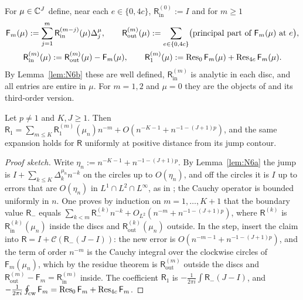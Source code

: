 For $\mu\in\mathbb{C}^J$ define, near each $e\in\{0,4c\}$, $\mathsf R_{\mathrm{in}}^{(0)}:=I$ and for $m\ge1$
\begin{equation}\label{eq:recursion}
\begin{gathered}
  \mathsf F_m(\mu):=\sum_{j=1}^m\mathsf R_{\mathrm{in}}^{(m-j)}(\mu)\Delta_j^\mu,\qquad
  \mathsf R_{\mathrm{out}}^{(m)}(\mu):=\sum_{e\in\{0,4c\}}\bigl(\text{principal part of }\mathsf F_m(\mu)\text{ at }e\bigr),\\
  \mathsf R_{\mathrm{in}}^{(m)}(\mu):=\mathsf R_{\mathrm{out}}^{(m)}(\mu)-\mathsf F_m(\mu),\qquad
  \mathsf R_1^{(m)}(\mu):=\operatorname{Res}_0\mathsf F_m(\mu)+\operatorname{Res}_{4c}\mathsf F_m(\mu).
\end{gathered}
\end{equation}
By Lemma~\ref{lem:N6b} these are well defined, $\mathsf R_{\mathrm{in}}^{(m)}$ is analytic in each disc, and all entries are
entire in $\mu$. For $m=1,2$ and $\mu=0$ they are the objects of \cite[Proposition~9.5]{PaperII} and its third-order
version.

\begin{proposition}\label{prop:N6c}
Let $p\ne1$ and $K,J\ge1$. Then $\mathsf R_1=\sum_{m\le K}\mathsf R_1^{(m)}(\mu_n)n^{-m}+O(n^{-K-1}+n^{-1-(J+1)p})$, and the
same expansion holds for $\mathsf R$ uniformly at positive distance from its jump contour.
\end{proposition}

\begin{proof}[Proof sketch]
Write $\eta_n:=n^{-K-1}+n^{-1-(J+1)p}$. By Lemma~\ref{lem:N6a} the jump is $I+\sum_{k\le K}\Delta_k^{\mu_n}n^{-k}$ on the circles
up to $O(\eta_n)$, and off the circles it is $I$ up to errors that are $O(\eta_n)$ in $L^1\cap L^2\cap L^\infty$, as in
\cite[Propositions~9.5 and~10.8]{PaperII}; the Cauchy operator is bounded uniformly in $n$. One proves by induction on
$m=1,\dots,K+1$ that the boundary value $\mathsf R_-$ equals $\sum_{k<m}\mathsf R_-^{(k)}n^{-k}+O_{L^2}(n^{-m}+n^{-1-(J+1)p})$, where
$\mathsf R^{(k)}$ is $\mathsf R^{(k)}_{\mathrm{in}}(\mu_n)$ inside the discs and $\mathsf R^{(k)}_{\mathrm{out}}(\mu_n)$ outside. In the
step, insert the claim into $\mathsf R=I+\mathcal C(\mathsf R_-(J-I))$: the new error is
$O(n^{-m-1}+n^{-1-(J+1)p})$, and the term of order $n^{-m}$ is the Cauchy integral over the clockwise circles of
$\mathsf F_m(\mu_n)$, which by the residue theorem is $\mathsf R_{\mathrm{out}}^{(m)}$ outside the discs and
$\mathsf R_{\mathrm{out}}^{(m)}-\mathsf F_m=\mathsf R_{\mathrm{in}}^{(m)}$ inside. The coefficient $\mathsf R_1$ is
$-\frac1{2\pi i}\int\mathsf R_-(J-I)$, and $-\frac1{2\pi i}\oint_{\mathrm{cw}}\mathsf F_m=\operatorname{Res}_0\mathsf F_m+\operatorname{Res}_{4c}\mathsf F_m$.
\end{proof}

